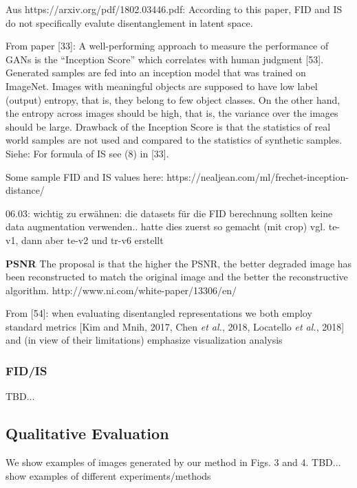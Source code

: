 \documentclass[12pt,a4paper]{article}
\begin{document}
Aus https://arxiv.org/pdf/1802.03446.pdf: According to this paper, FID and IS do not specifically evalute disentanglement in latent space.

From paper [33]: A well-performing approach to measure the performance of GANs is the
“Inception Score” which correlates with human judgment [53]. Generated samples are fed into an
inception model that was trained on ImageNet. Images with meaningful objects are supposed to
have low label (output) entropy, that is, they belong to few object classes. On the other hand, the
entropy across images should be high, that is, the variance over the images should be large. Drawback
of the Inception Score is that the statistics of real world samples are not used and compared to the
statistics of synthetic samples.
Siehe: For formula of IS see (8) in [33].
    
Some sample FID and IS values here: https://nealjean.com/ml/frechet-inception-distance/    
    
\par 06.03: wichtig zu erwähnen: die datasets für die FID berechnung sollten keine data augmentation verwenden.. hatte dies zuerst so gemacht (mit crop) vgl. te-v1, dann aber te-v2 und tr-v6 erstellt 
    
\par \textbf{PSNR} The proposal is that the higher the PSNR, the better degraded image has been reconstructed to match the original image and the better the reconstructive algorithm.
http://www.ni.com/white-paper/13306/en/
    
\par From [54]: when evaluating disentangled representations we both employ standard metrics [Kim and Mnih, 2017, Chen \textit{et al.}, 2018, Locatello \textit{et al.}, 2018] and (in view of their limitations) emphasize visualization analysis    
    
\subsubsection{FID/IS}    
TBD...
    
\subsection{Qualitative Evaluation}
We show examples of images generated by our method in Figs. 3 and 4.
TBD... show examples of different experiments/methods
\end{document}
